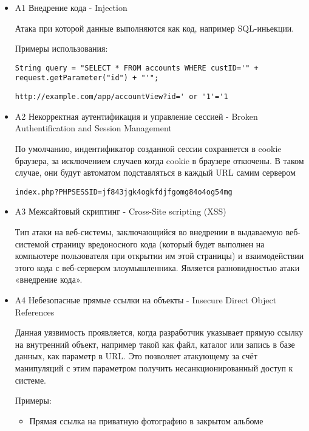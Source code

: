 \documentclass[11pt, a4paper]{article}		%
\begin{document}
\begin{itemize}

\item A1 Внедрение кода - Injection

Атака при которой данные выполняются как код, например SQL-иньекции.

Примеры использования:

\begin{verbatim}
String query = "SELECT * FROM accounts WHERE custID='" + request.getParameter("id") + "'";
\end{verbatim}

\begin{verbatim}
http://example.com/app/accountView?id=' or '1'='1
\end{verbatim}

\item A2 Некорректная аутентификация и управление сессией - Broken Authentification and Session Management

По умолчанию, индентификатор созданной сессии сохраняется в cookie браузера, за исключением случаев когда cookie в браузере откючены. В таком случае, они будут автоматом подставляться в каждый URL самим сервером

\begin{verbatim}
index.php?PHPSESSID=jf843jgk4ogkfdjfgomg84o4og54mg
\end{verbatim}

\item A3 Межсайтовый скриптинг - Cross-Site scripting (XSS)

Тип атаки на веб-системы, заключающийся во внедрении в выдаваемую веб-системой страницу вредоносного кода (который будет выполнен на компьютере пользователя при открытии им этой страницы) и взаимодействии этого кода с веб-сервером злоумышленника. Является разновидностью атаки «внедрение кода».

\item A4 Небезопасные прямые ссылки на объекты - Insecure Direct Object References

Данная уязвимость проявляется, когда разработчик указывает прямую ссылку на внутренний объект, например такой как файл, каталог или запись в базе данных, как параметр в URL. Это позволяет атакующему за счёт манипуляций с этим параметром получить несанкционированный доступ к системе.

Примеры:
\begin{itemize}

\item Прямая ссылка на приватную фотографию в закрытом альбоме


\end{itemize}
\end{itemize}
\end{document}
